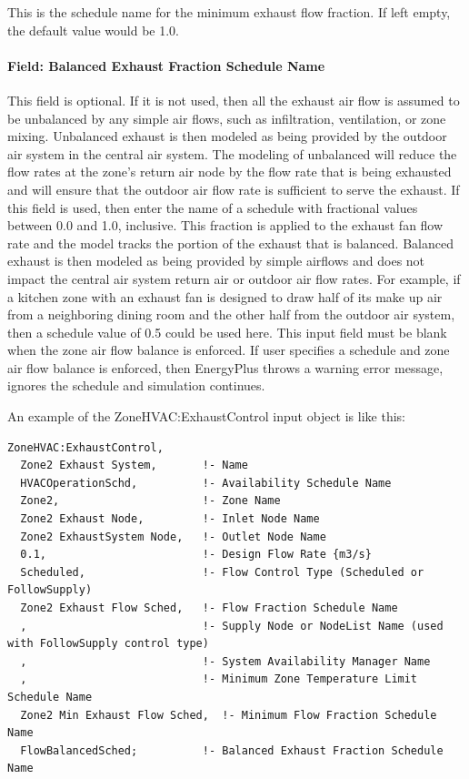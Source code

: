 This is the schedule name for the minimum exhaust flow fraction. If left empty, the default value would be 1.0.

\paragraph{Field: Balanced Exhaust Fraction Schedule Name}

This field is optional. If it is not used, then all the exhaust air flow is assumed to be unbalanced by any simple air flows, such as infiltration, ventilation, or zone mixing. Unbalanced exhaust is then modeled as being provided by the outdoor air system in the central air system. The modeling of unbalanced will reduce the flow rates at the zone’s return air node by the flow rate that is being exhausted and will ensure that the outdoor air flow rate is sufficient to serve the exhaust. If this field is used, then enter the name of a schedule with fractional values between 0.0 and 1.0, inclusive. This fraction is applied to the exhaust fan flow rate and the model tracks the portion of the exhaust that is balanced. Balanced exhaust is then modeled as being provided by simple airflows and does not impact the central air system return air or outdoor air flow rates. For example, if a kitchen zone with an exhaust fan is designed to draw half of its make up air from a neighboring dining room and the other half from the outdoor air system, then a schedule value of 0.5 could be used here. This input field must be blank when the zone air flow balance is enforced. If user specifies a schedule and zone air flow balance is enforced, then EnergyPlus throws a warning error message, ignores the schedule and simulation continues.

An example of the ZoneHVAC:ExhaustControl input object is like this:

\begin{lstlisting}
ZoneHVAC:ExhaustControl,
  Zone2 Exhaust System,       !- Name
  HVACOperationSchd,          !- Availability Schedule Name
  Zone2,                      !- Zone Name
  Zone2 Exhaust Node,         !- Inlet Node Name
  Zone2 ExhaustSystem Node,   !- Outlet Node Name
  0.1,                        !- Design Flow Rate {m3/s}
  Scheduled,                  !- Flow Control Type (Scheduled or FollowSupply)
  Zone2 Exhaust Flow Sched,   !- Flow Fraction Schedule Name
  ,                           !- Supply Node or NodeList Name (used with FollowSupply control type)
  ,                           !- System Availability Manager Name
  ,                           !- Minimum Zone Temperature Limit Schedule Name
  Zone2 Min Exhaust Flow Sched,  !- Minimum Flow Fraction Schedule Name
  FlowBalancedSched;          !- Balanced Exhaust Fraction Schedule Name
\end{lstlisting}

